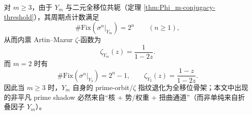 \begin{corollary}\label{cor:Phi_m-zeta-closed}
对 $m\ge 3$，由于 $Y_m$ 与二元全移位共轭（定理 \ref{thm:Phi_m-conjugacy-threshold}），其周期点计数满足
$$
\#\mathrm{Fix}(\sigma^n|_{Y_m})=2^n\qquad(n\ge 1),
$$
从而内禀 Artin--Mazur \(\zeta\)-函数为
$$
\zeta_{Y_m}(z)=\frac{1}{1-2z}.
$$
而 $m=2$ 时有
$$
\#\mathrm{Fix}(\sigma^n|_{Y_2})=2^n-1,\qquad
\zeta_{Y_2}(z)=\frac{1-z}{1-2z}.
$$
因此当 $m\ge 3$ 时，$Y_m$ 自身的 prime-orbit/\(\zeta\) 指纹退化为全移位骨架；本文中出现的非平凡 prime shadow 必然来自“核 + 势/权重 + 扭曲通道”（而非单纯来自折叠因子 $Y_m$）。
\end{corollary}
